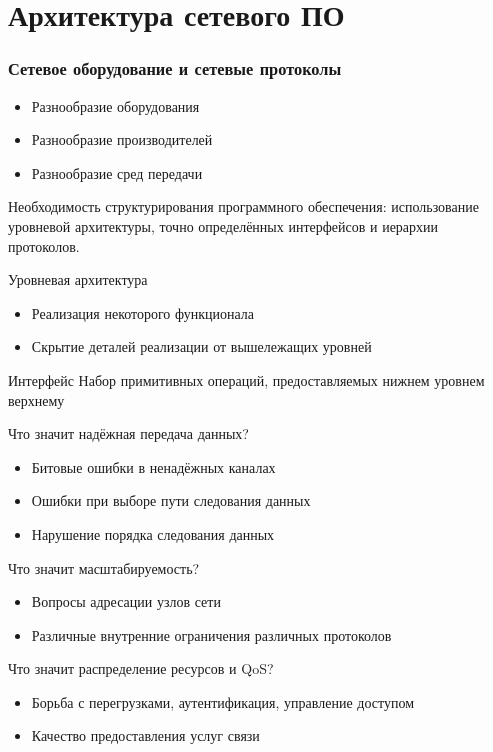 \documentclass[utf8]{beamer}
\begin{document}
\section{Архитектура сетевого ПО}
\begin{frame}
\frametitle{Сетевое оборудование и сетевые протоколы}
\begin{itemize}
 \item Разнообразие оборудования
 \item Разнообразие производителей
 \item Разнообразие сред передачи
\end{itemize}
Необходимость структурирования программного обеспечения: использование уровневой архитектуры, точно определённых интерфейсов и иерархии протоколов.
\begin{block}{Уровневая архитектура}
 \begin{itemize}
  \item Реализация некоторого функционала
  \item Скрытие деталей реализации от вышележащих уровней
 \end{itemize}
\end{block}
\begin{block}{Интерфейс}
 Набор примитивных операций, предоставляемых нижнем уровнем верхнему
\end{block}
\end{frame}
\begin{frame}
\small
\begin{block}{Что значит надёжная передача данных?}
\small
\begin{itemize}
 \item Битовые ошибки в ненадёжных каналах
 \item Ошибки при выборе пути следования данных
 \item Нарушение порядка следования данных
\end{itemize}
\end{block}
\begin{block}{Что значит масштабируемость?}
\small
\begin{itemize}
 \item Вопросы адресации узлов сети
 \item Различные внутренние ограничения различных протоколов
\end{itemize}
\end{block}
\begin{block}{Что значит распределение ресурсов и QoS?}
\small
\begin{itemize}
 \item Борьба с перегрузками, аутентификация, управление доступом
 \item Качество предоставления услуг связи
\end{itemize}
\end{block}
\end{frame}
\end{document}
